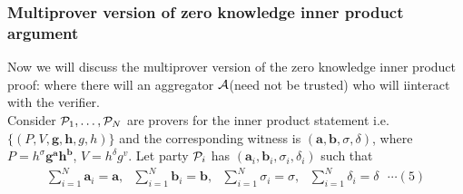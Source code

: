 \subsubsection{Multiprover version of zero knowledge inner product argument}
Now we will discuss the multiprover version of the zero knowledge inner product proof: where there will an aggregator ${\cal A}$(need not be trusted) who will iinteract with the verifier.\\
Consider ${\cal P}_1,\ldots, {\cal P}_N$ are provers for the inner product statement i.e. $\{(P,V,\bm{g},\bm{h},g,h)\}$ and the corresponding witness is $(\bm{a},\bm{b}, \sigma, \delta)$, where $P= h^{\sigma} \bm{g}^{\bm{a}} \bm{h}^{\bm{b}}$, $V=h^{\delta}g^{v}$. Let party ${\cal P}_i$ has $(\bm{a}_i,\bm{b}_i,\sigma_i,\delta_i)$ such that
\begin{align*}
	\sum\limits_{i=1}^{N}\bm{a}_i=\bm{a},\text{ }
	\sum\limits_{i=1}^{N}\bm{b}_i=\bm{b},\text{ }
	\sum\limits_{i=1}^{N}\sigma_i=\sigma,\text{ }
	\sum\limits_{i=1}^{N}\delta_i=\delta \text{ }\cdots(5)
\end{align*}
